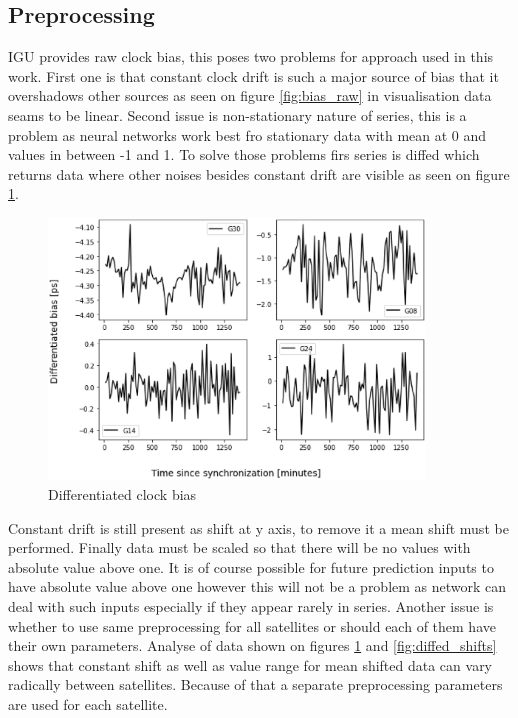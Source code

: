\documentclass{kybernetika}
\begin{document}
\subsection{Preprocessing}
IGU provides raw clock bias, this poses two problems for approach used in this work.
First one is that constant clock drift is such a major source of bias that it overshadows other
sources as seen on figure \ref{fig:bias_raw} in visualisation data seams to be linear.
Second issue is non-stationary nature of series, this is a problem as neural networks work best
fro stationary data with mean at 0 and values in between -1 and 1. To solve those problems firs
series is diffed which returns data where other noises besides constant drift are visible as
seen on figure \ref{fig:diffed_bias}.
\begin{figure}[ht] 
\centering
\includegraphics[width=10cm]{figures/bias_diffed}
\caption{Differentiated clock bias}
\label{fig:diffed_bias}
\end{figure}
Constant drift is still present as shift at y axis, to remove it a mean shift must be performed.
Finally data must be scaled so that there will be no values with absolute value above one. It is
of course possible for future prediction inputs to have absolute value above one however this will
not be a problem as network can deal with such inputs especially if they appear rarely in series.
Another issue is whether to use same preprocessing for all satellites or should each of them 
have their own parameters.
Analyse of data shown on figures \ref{fig:diffed_bias} and \ref{fig:diffed_shifts} shows that
constant shift as well as value range for mean shifted data can vary radically between satellites.
Because of that a separate preprocessing parameters are used for each satellite.
\end{document}

